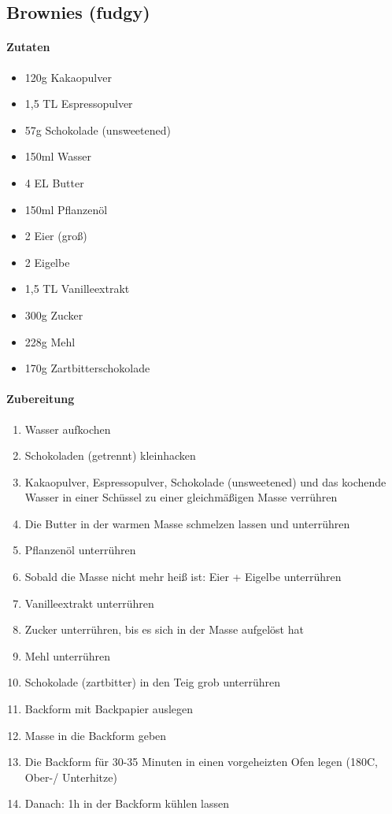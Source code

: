 \newpage
\subsection{Brownies (fudgy)}
\paragraph{Zutaten}
\begin{itemize}[noitemsep]
	\item 120g Kakaopulver
	\item 1,5 TL Espressopulver
	\item 57g Schokolade (unsweetened)
	\item 150ml Wasser
	\item 4 EL Butter
	\item 150ml Pflanzenöl
	\item 2 Eier (groß)
	\item 2 Eigelbe
	\item 1,5 TL Vanilleextrakt 
	\item 300g Zucker
	\item 228g Mehl 
	\item 170g Zartbitterschokolade
\end{itemize}
\paragraph{Zubereitung}
\begin{enumerate}[noitemsep]
	\item Wasser aufkochen
	\item Schokoladen (getrennt) kleinhacken
	\item Kakaopulver, Espressopulver, Schokolade (unsweetened) und das kochende Wasser in einer Schüssel zu einer gleichmäßigen Masse verrühren
	\item Die Butter in der warmen Masse schmelzen lassen und unterrühren
	\item Pflanzenöl unterrühren
	\item Sobald die Masse nicht mehr heiß ist: Eier + Eigelbe unterrühren
	\item Vanilleextrakt unterrühren
	\item Zucker unterrühren, bis es sich in der Masse aufgelöst hat
	\item Mehl unterrühren 
	\item Schokolade (zartbitter) in den Teig grob unterrühren
	\item Backform mit Backpapier auslegen
	\item Masse in die Backform geben
	\item Die Backform für 30-35 Minuten in einen vorgeheizten Ofen legen (180\textdegree C, Ober-/ Unterhitze)
	\item Danach: 1h in der Backform kühlen lassen  
\end{enumerate}
